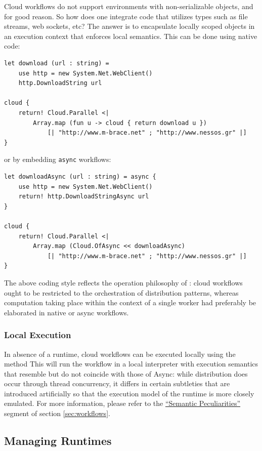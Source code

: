 Cloud workflows do not support environments with non-serializable objects,
and for good reason. So how does one integrate code that utilizes types such
as file streams, web sockets, etc?
%
The answer is to encapsulate locally scoped objects in an execution context
that enforces local semantics. This can be done using native \fsharp{} code:
\begin{lstlisting}
let download (url : string) =
	use http = new System.Net.WebClient()
	http.DownloadString url

cloud {
	return! Cloud.Parallel <|
		Array.map (fun u -> cloud { return download u })
			[| "http://www.m-brace.net" ; "http://www.nessos.gr" |]
}
\end{lstlisting}
or by embedding \texttt{async} workflows:
\begin{lstlisting}
let downloadAsync (url : string) = async {
	use http = new System.Net.WebClient()
	return! http.DownloadStringAsync url
}

cloud {
	return! Cloud.Parallel <|
		Array.map (Cloud.OfAsync << downloadAsync)
			[| "http://www.m-brace.net" ; "http://www.nessos.gr" |]
} 
\end{lstlisting}

The above coding style reflects the operation philosophy of \mbrace:
cloud workflows ought to be restricted to the orchestration of distribution patterns, 
whereas computation taking place within the context of a single worker 
had preferably be elaborated in native \dotnet{} or async workflows.

\subsubsection*{Local Execution}

In absence of a runtime, cloud workflows can be executed locally using the method
%
%
This will run the workflow in a local interpreter with execution semantics that resemble
but do not coincide with those of Async: while distribution does occur through thread 
concurrency, it differs in certain subtleties that are introduced artificially so that 
the execution model of the \mbrace{} runtime is more closely emulated.
For more information, please refer to the \href{peculiarities}{``Semantic Peculiarities''}
segment of section \ref{sec:workflows}.

\subsection{Managing \TitularMbrace{} Runtimes}

